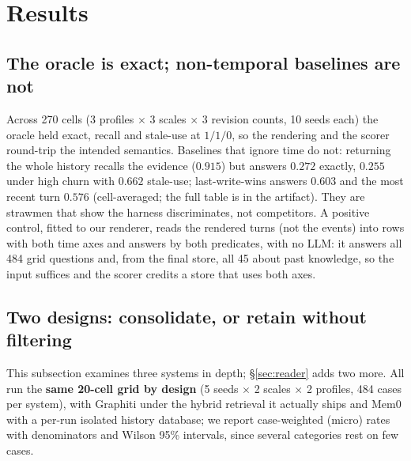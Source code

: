 \documentclass[conference]{IEEEtran}
\begin{document}
\section{Results}\label{sec:results}

\subsection{The oracle is exact; non-temporal baselines are not}

Across 270 cells (3 profiles $\times$ 3 scales $\times$ 3 revision counts, 10 seeds
each) the oracle held exact, recall and stale-use at $1/1/0$, so the rendering
and the scorer round-trip the intended semantics. Baselines that ignore time do
not: returning the whole history recalls the evidence ($0.915$) but answers
$0.272$ exactly, $0.255$ under high churn with $0.662$ stale-use;
last-write-wins answers $0.603$ and the most recent turn $0.576$
(cell-averaged; the full table is in the artifact). They are strawmen that show
the harness discriminates, not competitors. A positive control, fitted to our
renderer, reads the rendered turns (not the events) into rows with both time
axes and answers by both predicates, with no LLM: it answers all 484 grid
questions and, from the final store, all 45 about past knowledge, so the input
suffices and the scorer credits a store that uses both axes.

\subsection{Two designs: consolidate, or retain without filtering}

This subsection examines three systems in depth; \S\ref{sec:reader} adds two
more. All run the \textbf{same 20-cell grid by design} (5 seeds $\times$ 2
scales $\times$ 2 profiles, 484 cases per system), with Graphiti under the hybrid
retrieval it actually ships and Mem0 with a per-run isolated history database; we report case-weighted
(micro) rates with denominators and Wilson 95\% intervals, since several
categories rest on few cases.
\end{document}
